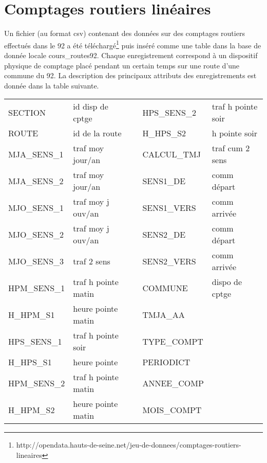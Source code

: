 


\section{Comptages routiers linéaires}
Un fichier (au format csv) contenant des données sur des comptages routiers effectués dans le 92 a été téléchargé\footnote{http://opendata.hauts-de-seine.net/jeu-de-donnees/comptages-routiers-lineaires} puis inséré comme une table dans la base de donnée locale cours\_routes92.
Chaque enregistrement correspond à un dispositif physique de comptage placé pendant un certain temps sur une route d'une commune du 92. La description des principaux attributs des enregistrements est donnée dans la table suivante.
\begin{center}
\begin{tabular}{ll|lll}
SECTION    & id disp de cptge &  & HPS\_SENS\_2 & traf h pointe soir\\
ROUTE      & id de la route          &  & H\_HPS\_S2   & h pointe soir\\
MJA\_SENS\_1 & traf moy jour/an        &  & CALCUL\_TMJ & traf cum 2 sens \\
MJA\_SENS\_2 & traf moy jour/an  &  & SENS1\_DE   & comm départ\\
MJO\_SENS\_1 & traf moy j ouv/an        &  & SENS1\_VERS & comm arrivée \\
MJO\_SENS\_2 & traf moy j ouv/an  &  & SENS2\_DE   & comm départ \\
MJO\_SENS\_3 & traf 2 sens             &  & SENS2\_VERS & comm arrivée \\
HPM\_SENS\_1 & traf h pointe matin &  & COMMUNE    & dispo de cptge \\
H\_HPM\_S1   & heure pointe matin      &  & TMJA\_AA    &  \\
HPS\_SENS\_1 & traf h pointe soir  &  & TYPE\_COMPT &  \\
H\_HPS\_S1   & heure pointe            &  & PERIODICT  &  \\
HPM\_SENS\_2 & traf h pointe matin &  & ANNEE\_COMP &  \\
H\_HPM\_S2   & heure pointe matin      &  & MOIS\_COMPT & 
\end{tabular}
\end{center}

